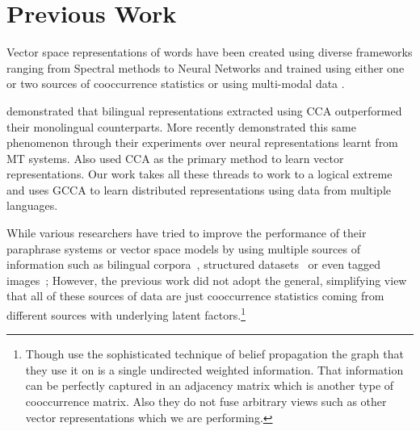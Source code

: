 \documentclass[11pt]{article}
\begin{document}
\section{Previous Work}
\label{sec:previouswork}
Vector space representations of words have been created using diverse
 frameworks ranging from Spectral methods
 \cite{dhillon2011multi,dhillon2012two}
 to Neural Networks
 \cite{mikolov2013efficient,mikolov2013distributed,collobert2013word}
 and trained using either one
 \cite{pennington2014glove}
 or two sources of cooccurrence statistics
 \cite{zou2013bilingual,faruqui2014improving,bansal2014tailoring,levy2014dependency}
 or using multi-modal data
 \cite{felix2014learning,bruni2012distributional}.
 
\cite{faruqui2014improving} demonstrated that bilingual
representations extracted using CCA outperformed their monolingual 
counterparts.
More recently \cite{hill2014not} demonstrated this same
phenomenon through their experiments over neural representations learnt from MT
systems. Also \cite{dhillon2011multi,dhillon2012two} used
CCA as the primary method to learn vector representations. Our work
takes all these threads to work to a logical extreme and uses GCCA to learn distributed
representations using data from multiple languages.

While various researchers have tried to improve the
performance of their paraphrase systems or vector space models by using
multiple sources of information such as bilingual
corpora~\cite{bannard2005paraphrasing,Huang2012Improving,zou2013bilingual}, 
structured datasets~\cite{yu2014improving,faruqui2014retrofitting} or even
tagged images~\cite{bruni2012distributional}; 
However, the previous
work did not adopt the general, simplifying view that 
all of these sources of data are just cooccurrence 
statistics coming from different sources with underlying latent
factors.\footnote{Though \cite{faruqui2014retrofitting} use
  the sophisticated technique of belief propagation the graph that
  they use it on is a single undirected weighted information. That
  information can be perfectly captured in an adjacency matrix which is another type of
cooccurrence matrix. Also they do not fuse arbitrary views such as
other vector representations which we are performing.}
\end{document}

